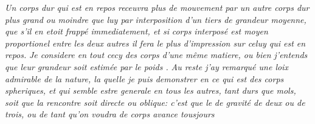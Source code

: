 \textit{Un corps dur qui est en repos receuvra plus de mouvement par un autre corps dur plus grand ou moindre que luy par} 
%
%
\textit{interposition\protect{} d'un tiers de grandeur moyenne, que s'il en etoit frappé immediatement, et si}  
%
\textit{corps interposé\protect{} est %
moyen proportionel\protect{} entre les deux 
autres il fera le plus d'impression sur celuy qui est en repos.}
\pend \pstart
\hspace{1mm}\hspace{-1mm}%
%
\textit{Je considere en tout cecy des corps d'une même matiere, ou bien j'entends que leur grandeur
soit estimée par le poids%
\protect{}.}
\pend  
%
\pstart
\textit{Au reste j'ay remarqué une loix admirable de la nature\protect{},
la quelle je puis demonstrer en ce qui est des corps spheriques,%
\protect{} et qui semble estre
generale en tous les autres,}
%
%
\textit{tant durs%
\protect{} que mols,%
\protect{} soit que la rencontre soit directe%
\protect{} ou oblique:%
\protect{} c'est que le} 
%
%
\textit{de gravité\protect{} de deux ou de trois, ou de tant qu'on voudra de corps avance tousjours}
%
